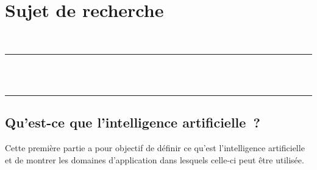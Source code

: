 \chapter{Sujet de recherche}
~
\\
\rule{\linewidth}{0.5pt}
\\[0.8cm]
{\LARGE\textsc{\sujet} \\[0.4cm]}
\rule{\linewidth}{0.5pt}

\newpage

\section{Qu'est-ce que l'intelligence artificielle~?}

Cette première partie a pour objectif de définir ce qu'est l'intelligence artificielle et de montrer les domaines d'application dans lesquels celle-ci peut être utilisée.



\newpage


\newpage


\newpage


\newpage
